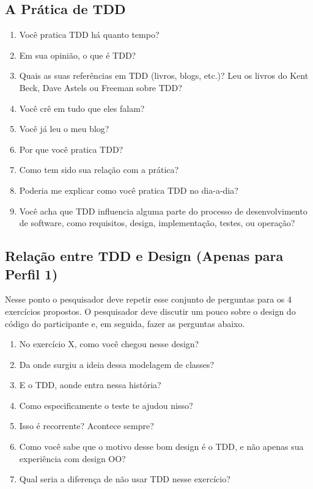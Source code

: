 \subsection{A Prática de TDD}

\begin{enumerate}
	\item Você pratica TDD há quanto tempo?

	\item Em sua opinião, o que é TDD?
	
	\item Quais as suas referências em TDD (livros, blogs, etc.)? 
		  Leu os livros do Kent Beck, Dave Astels ou Freeman sobre TDD?

	\item Você crê em tudo que eles falam?
	
	\item Você já leu o meu blog?
	
	\item Por que você pratica TDD?

	\item Como tem sido sua relação com a prática?

	\item Poderia me explicar como você pratica TDD no dia-a-dia?

	\item Você acha que TDD influencia alguma parte do processo de desenvolvimento
	de software, como requisitos, design, implementação, testes, ou operação?
\end{enumerate}

\subsection{Relação entre TDD e Design (Apenas para Perfil 1)}

Nesse ponto o pesquisador deve repetir esse conjunto de perguntas
para os 4 exercícios propostos.
O pesquisador deve discutir um pouco sobre o design do código do participante e, em seguida,
fazer as perguntas abaixo.

\begin{enumerate}
	
	\item No exercício X, como você chegou nesse design?
	
	\item Da onde surgiu a ideia dessa modelagem de classes?
	
	\item E o TDD, aonde entra nessa história?
	
	\item Como especificamente o teste te ajudou nisso?
	
	\item Isso é recorrente? Acontece sempre?
	
	\item Como você sabe que o motivo desse bom design é o TDD, e não apenas sua experiência
	com design OO?
	
	\item Qual seria a diferença de não usar TDD nesse exercício?
\end{enumerate}

